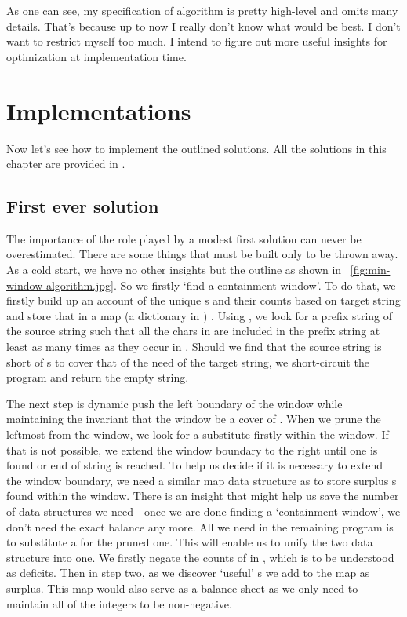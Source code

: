 As one can see, my specification of algorithm is pretty high-level and omits many details.
That's because up to now I really don't know what would be best.
I don't want to restrict myself too much.
I intend to figure out more useful insights for optimization at implementation time.

\section{Implementations}\label{sec:implementations.min-window}

Now let's see how to implement the outlined solutions.
All the solutions in this chapter are provided in \java.

\subsection{First ever solution}

The importance of the role played by a modest first solution can never be overestimated.
There are some things that must be built only to be thrown away.
As a cold start, we have no other insights but the outline as shown in
~\autoref{fig:min-window-algorithm.jpg}.
So we firstly `find a containment window'.
To do that, we firstly build up an account of the unique s and their counts based on target
string and store that in a map (a dictionary in \python) .
Using , we look for a prefix string of the source string such that all the
chars in  are included in the prefix string at least as many times as they occur in
.
Should we find that the source string is short of s to cover that of the need
of the target string, we short-circuit the program and return the empty string.

The next step is dynamic push the left boundary of the window while maintaining the invariant
that the window be a cover of .
When we prune the leftmost  from the window, we look for a substitute firstly within the
window.
If that is not possible, we extend the window boundary to the right until one is found or end of
string is reached.
To help us decide if it is necessary to extend the window boundary,
we need a similar map data structure as  to store surplus s found within the
window.
There is an insight that might help us save the number of data structures we need---once we are
done finding a `containment window', we don't need the exact  balance
any more.
All we need in the remaining program is to substitute a  for the pruned one.
This will enable us to unify the two data structure into one.
We firstly negate the counts of  in , which is to be understood as deficits.
Then in step two, as we discover `useful' s we add to the map as surplus.
This map would also serve as a balance sheet as we only need to maintain all of the integers to
be non-negative.

